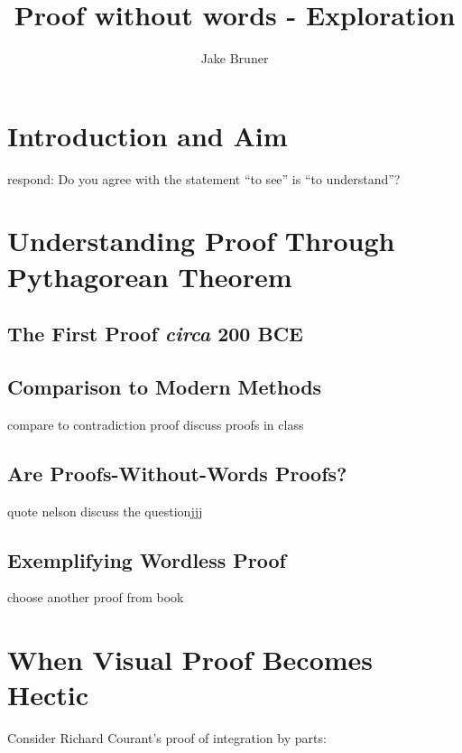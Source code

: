 \documentclass[11pt,a4paper]{article}
\author{Jake Bruner}
\title{Proof without words - Exploration}
\begin{document}
\maketitle
\tableofcontents
\pagebreak

\section{Introduction and Aim}



respond: Do you agree with the statement “to see” is “to understand”?




\section{Understanding Proof Through Pythagorean Theorem}
\subsection{The First Proof \textit{circa} 200 BCE}
\subsection{Comparison to Modern Methods}
compare to contradiction proof
discuss proofs in class
\subsection{Are Proofs-Without-Words Proofs?}
quote nelson 
discuss the questionjjj
\subsection{Exemplifying Wordless Proof}
choose another proof from book
\pagebreak
\section{When Visual Proof Becomes Hectic}

Consider Richard Courant's proof of integration by parts: 
\end{document}
